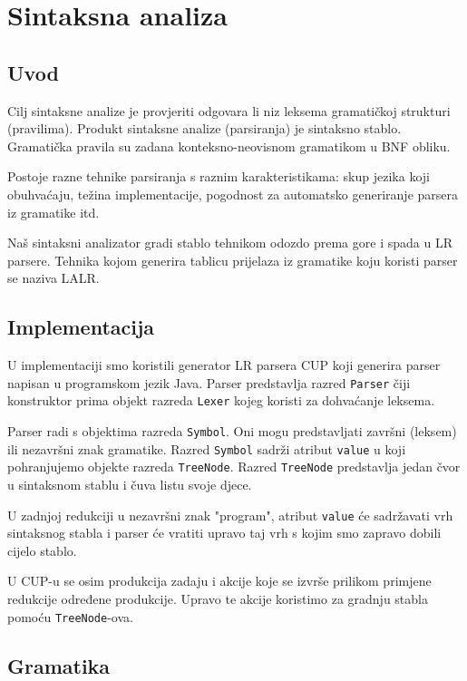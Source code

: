 \chapter{Sintaksna analiza}

\section{Uvod}
Cilj sintaksne analize je provjeriti odgovara li niz leksema gramatičkoj strukturi (pravilima). Produkt
sintaksne analize (parsiranja) je sintaksno stablo. Gramatička pravila su zadana konteksno-neovisnom
gramatikom u BNF obliku.

Postoje razne tehnike parsiranja s raznim karakteristikama: skup jezika koji obuhvaćaju, težina
implementacije, pogodnost za automatsko generiranje parsera iz gramatike itd.

Naš sintaksni analizator gradi stablo tehnikom odozdo prema gore i spada u LR parsere. Tehnika
kojom generira tablicu prijelaza iz gramatike koju koristi parser se naziva LALR.

\section{Implementacija}

U implementaciji smo koristili generator LR parsera CUP koji generira parser napisan u programskom jezik Java.
Parser predstavlja razred \texttt{Parser} čiji konstruktor prima objekt razreda \texttt{Lexer}
kojeg koristi za dohvaćanje leksema.

Parser radi s objektima razreda \texttt{Symbol}. Oni mogu predstavljati završni (leksem) ili nezavršni znak gramatike.
Razred \texttt{Symbol} sadrži atribut \texttt{value} u koji pohranjujemo objekte razreda \texttt{TreeNode}. Razred
\texttt{TreeNode} predstavlja jedan čvor u sintaksnom stablu i čuva listu svoje djece.

U zadnjoj redukciji u nezavršni znak "program", atribut \texttt{value} će sadržavati vrh sintaksnog stabla i parser
će vratiti upravo taj vrh s kojim smo zapravo dobili cijelo stablo.

U CUP-u se osim produkcija zadaju i akcije koje se izvrše prilikom primjene redukcije određene produkcije. Upravo
te akcije koristimo za gradnju stabla pomoću \texttt{TreeNode}-ova.

\section{Gramatika}

